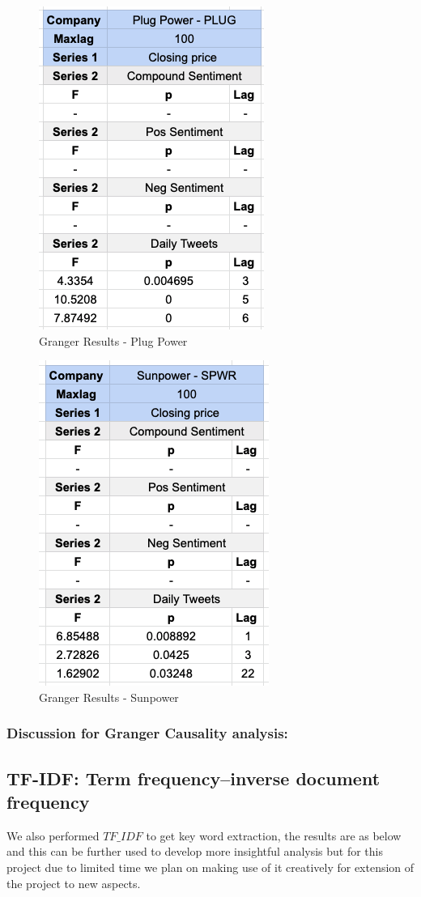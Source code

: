 \documentclass[sigconf, nonacm]{acmart}
\begin{document}
\begin{figure}[H]
  \centering
  \includegraphics[width=0.4\linewidth]{granger_results/granger_plug.png}
  \caption{Granger Results - Plug Power}
  \label{granger_plug}
\end{figure}

\begin{figure}[H]
  \centering
  \includegraphics[width=0.4\linewidth]{granger_results/granger_sunpower.png}
  \caption{Granger Results - Sunpower}
  \label{granger_sunpower}
\end{figure}


\subsubsection{Discussion for Granger Causality analysis:}

\subsection{TF-IDF: Term frequency–inverse document frequency} 
We also performed $TF\_IDF$ to get key word extraction, the results are as below and this can be further used to develop more insightful analysis but for this project due to limited time we plan on making use of it creatively for extension of the project to new aspects.
\end{document}
